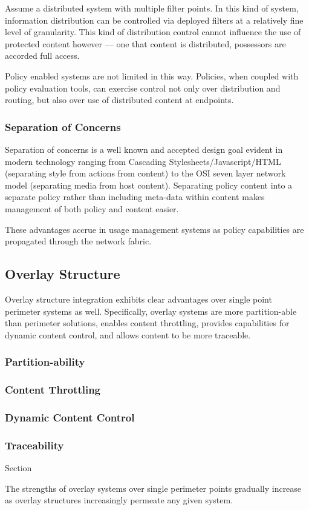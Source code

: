 Assume a distributed system with multiple filter points.  In this kind of system, information distribution can be controlled via deployed filters at a relatively fine level of granularity.  This kind of distribution control cannot influence the use of protected content however --- one that content is distributed, possessors are accorded full access.

Policy enabled systems are not limited in this way.  Policies, when coupled with policy evaluation tools, can exercise control not only over distribution and routing, but also over use of distributed content at endpoints.

\subsubsection*{Separation of Concerns}
Separation of concerns is a well known and accepted design goal evident in modern technology ranging from Cascading Stylesheets/Javascript/HTML (separating style from actions from content) to the OSI seven layer network model (separating media from host content).  Separating policy content into a separate policy rather than including meta-data within content makes management of both policy and content easier.

These advantages accrue in usage management systems as policy capabilities are propagated through the network fabric.

\subsection{Overlay Structure}
Overlay structure integration exhibits clear advantages over single point perimeter systems as well.  Specifically, overlay systems are more partition-able than perimeter solutions, enables content throttling, provides capabilities for dynamic content control, and allows content to be more traceable.

\subsubsection*{Partition-ability}

\subsubsection*{Content Throttling}

\subsubsection*{Dynamic Content Control}

\subsubsection*{Traceability}
Section

The strengths of overlay systems over single perimeter points gradually increase as overlay structures increasingly permeate any given system.